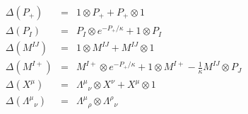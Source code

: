 \begin{equation}\label{7}
\begin{array}{rcl}
\Delta(P_+)&=&1\otimes P_+ +P_+\otimes 1\\
\Delta(P_I)&=&P_I\otimes e^{-P_+/\kappa}+1\otimes P_I\\
\Delta(M^{IJ})&=&1\otimes M^{IJ}+M^{IJ}\otimes 1\\
\Delta(M^{I+})&=&M^{I+}\otimes e^{-P_+/\kappa}+1\otimes M^{I+}-\frac{1}{\kappa}M^{IJ}\otimes P_J\\
\Delta(X^{\mu})&=&\Lambda^{\mu}{}_{\nu}\otimes X^{\nu}+X^{\mu}\otimes 1\\
\Delta(\Lambda^{\mu}{}_{\nu})&=&\Lambda^{\mu}{}_{\rho}\otimes
\Lambda^{\rho}{}_{\nu}\\
\end{array}
\end{equation}

